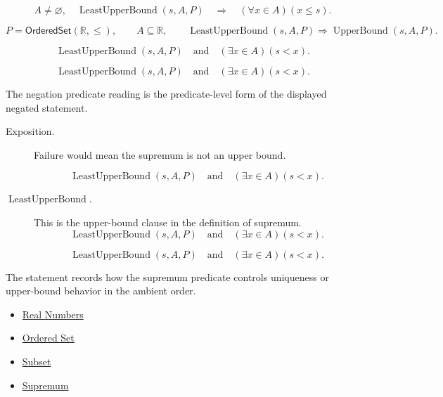 \begin{remark*}
\[
  A\neq\varnothing,\quad \operatorname{LeastUpperBound}(s,A,P)
  \quad\Longrightarrow\quad
  (\forall x\in A)(x\leq s).
\]
\end{remark*}

\begin{remark*}
\[
  P=\mathsf{OrderedSet}(\mathbb{R},\leq),\qquad A\subseteq\mathbb{R},\qquad
  \operatorname{LeastUpperBound}(s,A,P)\Longrightarrow \operatorname{UpperBound}(s,A,P).
\]
\end{remark*}

\begin{remark*}
\[
  \operatorname{LeastUpperBound}(s,A,P)\quad\text{and}\quad(\exists x\in A)(s<x).
\]
\end{remark*}

\begin{remark*}
\[
  \operatorname{LeastUpperBound}(s,A,P)\quad\text{and}\quad(\exists x\in A)(s<x).
\]

The negation predicate reading is the predicate-level form of the displayed negated statement.
\end{remark*}

\begin{remark*}
\begin{description}
  \item[Exposition.]
  Failure would mean the supremum is not an upper bound.

  
\[
  \operatorname{LeastUpperBound}(s,A,P)\quad\text{and}\quad(\exists x\in A)(s<x).
\]
  \item[\(\operatorname{LeastUpperBound}.\)]
  This is the upper-bound clause in the definition of supremum.
  \[
    \operatorname{LeastUpperBound}(s,A,P)\quad\text{and}\quad(\exists x\in A)(s<x).
  \]

\[
    \operatorname{LeastUpperBound}(s,A,P)\quad\text{and}\quad(\exists x\in A)(s<x).
  \]
\end{description}
\end{remark*}

\begin{remark*}[Interpretation]
The statement records how the supremum predicate controls uniqueness or upper-bound behavior in the ambient order.
\end{remark*}

\begin{dependencies}
\begin{itemize}
  \item \hyperref[def:reals]{Real Numbers}
  \item \hyperref[def:ordered-set]{Ordered Set}
  \item \hyperref[def:subset]{Subset}
  \item \hyperref[def:supremum]{Supremum}
\end{itemize}
\end{dependencies}

